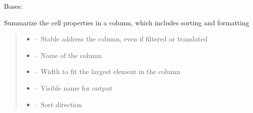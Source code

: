 \documentclass[letterpaper,10pt,english]{sphinxmanual}
\begin{document}
\begin{savenotes}\begin{fulllineitems}
\label{\detokenize{eezz:eezz.table.TTableColumn}}
\pysigstartsignatures
{}
\pysigstopsignatures
\sphinxAtStartPar
Bases: 

\sphinxAtStartPar
Summarize the cell properties in a column, which includes sorting and formatting
\begin{quote}\begin{description}
\begin{itemize}
\item {} 
\sphinxAtStartPar
{} – Stable address the column, even if filtered or translated

\item {} 
\sphinxAtStartPar
{} – Name of the column

\item {} 
\sphinxAtStartPar
{} – Width to fit the largest element in the column

\item {} 
\sphinxAtStartPar
{} – Visible name for output

\item {} 
\sphinxAtStartPar
{} – Sort direction


\end{itemize}
\end{description}
\end{quote}
\end{fulllineitems}
\end{savenotes}
\end{document}
